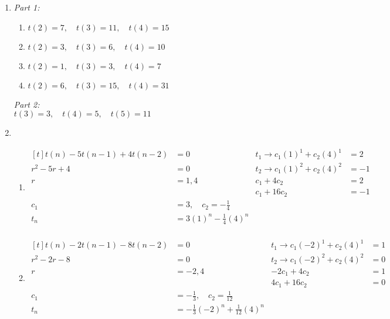 \begin{enumerate}[leftmargin=2cm,labelsep=.5cm,label=\bf\arabic*.]
\item \textit{Part 1:}
\begin{enumerate}
\item $t(2) = 7, \quad t(3) = 11, \quad t(4) = 15$
\item $t(2) = 3, \quad t(3) = 6,  \quad t(4) = 10$
\item $t(2) = 1, \quad t(3) = 3,  \quad t(4) = 7$
\item $t(2) = 6, \quad t(3) = 15, \quad t(4) = 31$\\[2mm]
\end{enumerate}
\textit{Part 2:}\\
$t(3) = 3, \quad t(4) = 5, \quad t(5) = 11$\\[1cm]

\item
\begin{enumerate}
\item $
\begin{aligned}[t]
t(n) - 5t(n-1) + 4t(n-2) &= 0 & t_1 \rightarrow c_1(1)^1 + c_2(4)^1 &= 2 \\
r^2 - 5r + 4 &= 0             & t_2 \rightarrow c_1(1)^2 + c_2(4)^2 &= -1 \\
r &= 1, 4                     & c_1 + 4c_2 &= 2 \\
&                             & c_1 + 16c_2 &= -1 \\[2mm]
c_1 &= 3, \quad c_2 = -\frac{1}{4}  & & \\
t_n &= 3(1)^n -\frac{1}{4}(4)^n \\[1cm]
\end{aligned} $


\item $
\begin{aligned}[t]
t(n) - 2t(n-1) - 8t(n-2) &= 0 & t_1 \rightarrow c_1(-2)^1 + c_2(4)^1 &= 1 \\
r^2 - 2r - 8 &= 0             & t_2 \rightarrow c_1(-2)^2 + c_2(4)^2 &= 0 \\
r &= -2, 4                    & -2c_1 + 4c_2 &= 1 \\
&                             & 4c_1 + 16c_2 &= 0 \\[2mm]
c_1 &= -\frac{1}{3}, \quad c_2 = \frac{1}{12}  & & \\
t_n &= -\frac{1}{3}(-2)^n + \frac{1}{12}(4)^n \\[1cm]
\end{aligned} $


\end{enumerate}
\end{enumerate}

